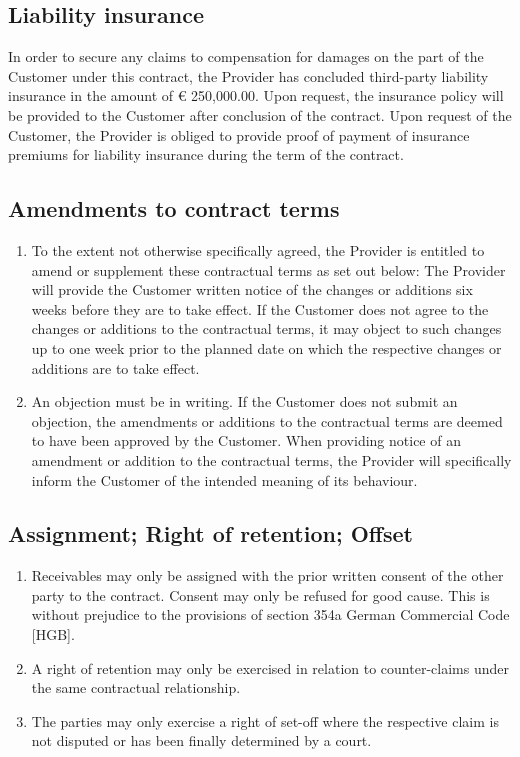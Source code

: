 \documentclass{terms}
\begin{document}
\subsection{Liability insurance}
In order to secure any claims to compensation for damages on the part of the Customer under this contract, the Provider has concluded third-party liability insurance in the amount of € 250,000.00.
Upon request, the insurance policy will be provided to the Customer after conclusion of the contract.
Upon request of the Customer, the Provider is obliged to provide proof of payment of insurance premiums for liability insurance during the term of the contract.

\subsection{Amendments to contract terms}
\begin{enumerate}
\item To the extent not otherwise specifically agreed, the Provider is entitled to amend or supplement these contractual terms as set out below: The Provider will provide the Customer written notice of the changes or additions six weeks before they are to take effect.
      If the Customer does not agree to the changes or additions to the contractual terms, it may object to such changes up to one week prior to the planned date on which the respective changes or additions are to take effect.
\item An objection must be in writing.
      If the Customer does not submit an objection, the amendments or additions to the contractual terms are deemed to have been approved by the Customer.
      When providing notice of an amendment or addition to the contractual terms, the Provider will specifically inform the Customer of the intended meaning of its behaviour.
\end{enumerate}

\subsection{Assignment; Right of retention; Offset}
\begin{enumerate}
\item Receivables may only be assigned with the prior written consent of the other party to the contract.
      Consent may only be refused for good cause.
      This is without prejudice to the provisions of section 354a German Commercial Code [HGB].
\item A right of retention may only be exercised in relation to counter-claims under the same contractual relationship.
\item The parties may only exercise a right of set-off where the respective claim is not disputed or has been finally determined by a court.
\end{enumerate}
\end{document}
